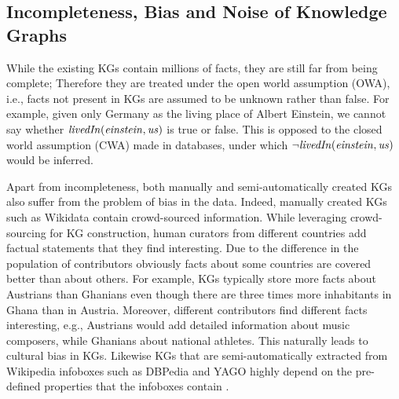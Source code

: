 \subsection{Incompleteness, Bias and Noise of Knowledge Graphs}
\label{sec:kg_realm}
While the existing KGs contain millions of facts, they are still far from being complete; Therefore they are treated under the open world assumption (OWA), i.e., facts not present in KGs are assumed to be unknown rather than false. For example, given only Germany as the living place of Albert Einstein,  we cannot say whether $\mathit{livedIn(einstein,us)}$ is true or false. This is opposed to the closed world assumption (CWA) made in databases, under which $\mathit{\neg livedIn(einstein,us)}$ would be inferred. %

Apart from incompleteness, both manually and semi-automatically created KGs also suffer from the problem of bias in the data. Indeed,  manually created KGs such as Wikidata contain crowd-sourced information. While leveraging crowd-sourcing for KG construction, human curators from different countries add factual statements that they find interesting. Due to the difference in the population of contributors obviously facts about some countries are covered better than about others. For example, KGs typically store more facts about Austrians than Ghanians even though there are three times more inhabitants in Ghana than in Austria.
Moreover, different contributors find different facts interesting, e.g., Austrians would add detailed information about music composers, while Ghanians about national athletes.  This naturally leads to cultural bias in KGs. Likewise KGs that are semi-automatically extracted from Wikipedia infoboxes such as DBPedia and YAGO highly depend on the pre-defined properties that the infoboxes contain \cite{DBLP:conf/www/LajusS18}. %

